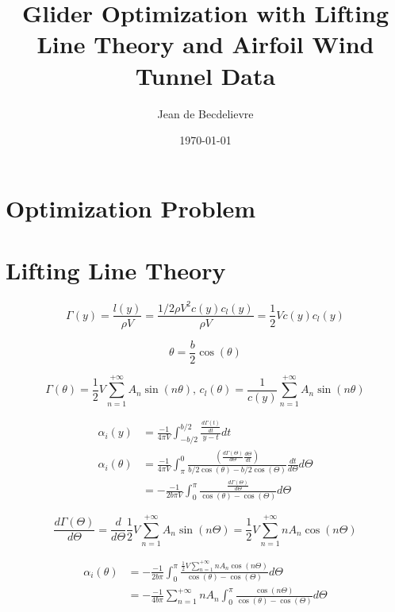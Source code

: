\documentclass[letterpaper,12pt]{article}
\begin{document}
\title{Glider Optimization with Lifting Line Theory and Airfoil Wind Tunnel Data}
\author{Jean de Becdelievre}
\date{\today}
\maketitle

\section{Optimization Problem}

\section{Lifting Line Theory}

$$\Gamma(y) = \frac{l(y)}{\rho V} = \frac{1/2 \rho V^2 c(y) c_l(y)}{\rho V} =  \frac{1}{2} V c(y) c_l(y)$$

$$\theta = \frac{b}{2}\cos(\theta)$$

$$\Gamma(\theta) = \frac{1}{2} V\sum_{n=1}^{+\infty} A_n \sin(n\theta) \text{,      } c_l(\theta) = \frac 1 {c(y)} \sum_{n=1}^{+\infty} A_n \sin(n\theta)$$

	\begin{align*}
		\alpha_i(y) &= \frac{-1}{4\pi V}\int_{-b/2}^{b/2} \frac{\frac{d\Gamma(t)}{dt}}{y-t} dt \\ 
		\alpha_i(\theta) &= \frac{-1}{4\pi V} \int_{\pi}^{0} \frac{\left( \frac{d\Gamma(\Theta)}{d\Theta} \frac{d\Theta}{dt}\right)}{b/2\cos(\theta)-b/2\cos(\Theta)}\frac{dt}{d\Theta} d\Theta	 \\
				 &= -\frac{-1}{2b\pi V} \int_{0}^{\pi} \frac{\frac{d\Gamma(\Theta)}{d\Theta}}{\cos(\theta)-\cos(\Theta)} d\Theta	
	\end{align*}

$$\frac{d\Gamma(\Theta)}{d\Theta} = \frac{d}{d\Theta}\frac12 V\sum_{n=1}^{+\infty} A_n \sin(n\Theta)  = \frac{1}{2} V\sum_{n=1}^{+\infty} n A_n \cos(n\Theta) $$

\begin{align*}
	\alpha_i(\theta) &= -\frac{-1}{2b\pi }  \int_{0}^{\pi} \frac{ \frac{1}{2} V\sum_{n=1}^{+\infty} n A_n \cos(n\Theta) }{\cos(\theta)-\cos(\Theta)} d\Theta	\\
				&= -\frac{-1}{4b\pi }  \sum_{n=1}^{+\infty} n A_n \int_{0}^{\pi} \frac{ \cos(n\Theta) }{\cos(\theta)-\cos(\Theta)} d\Theta	\\
\end{align*}
\end{document}
